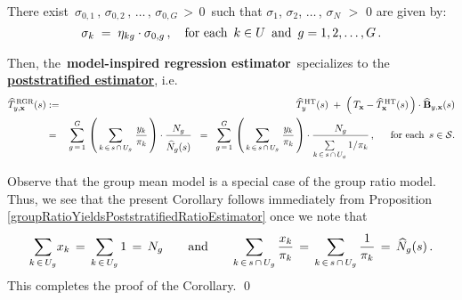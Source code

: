 \begin{corollary}
\begin{enumerate}
	There exist \,$\sigma_{0,1} \,,\, \sigma_{0,2} \,,\, \ldots \,,\, \sigma_{0,G} \,>\, 0$\,
	such that
	$\sigma_{1}$, $\sigma_{2}$, $\ldots$\,, $\sigma_{N}$ $>$ $0$ are given by:
	\begin{equation*}
	\sigma_{k} \; = \; \eta_{kg}\cdot\sigma_{0,g}\,,
	\quad\textnormal{for each \,$k \in U$\, and \,$g = 1,2,\ldots,G$}\,.
	\end{equation*}
\end{enumerate}
\renewcommand{\theenumi}{\roman{enumi}}
\renewcommand{\labelenumi}{\textnormal{(\theenumi)}$\;\;$}
Then, the \,\textbf{model-inspired regression estimator}\,
specializes to the \,\underline{\textbf{{\color{red}poststratified} estimator}}, i.e.
\begin{eqnarray*}
\widehat{T}^{\,\textnormal{RGR}}_{y,\mathbf{x}}(s)
& := &
	\widehat{T}^{\,\textnormal{HT}}_{y}(s)
	\; + \;
	\left(\,T_{\mathbf{x}} - \widehat{T}^{\,\textnormal{HT}}_{\mathbf{x}}(s) \,\right)
	\cdot
	\widehat{\mathbf{B}}_{y,\mathbf{x}}(s)
\\
& = &
	\overset{G}{\underset{g\,=\,1}{\sum}}\,
	\left(\, \underset{k\,\in\,s\,\cap\,U_{g}}{\sum}\; \dfrac{ y_{k} }{ \pi_{k}} \,\right)
	\cdot
	\dfrac{
		N_{g}
	}{
		\overset{{\color{white}.}}{\widehat{N}_{g}(s)}
	}
\;\; = \;\;
	\overset{G}{\underset{g\,=\,1}{\sum}}\,
	\left(\, \underset{k\,\in\,s\,\cap\,U_{g}}{\sum}\; \dfrac{ y_{k} }{ \pi_{k}} \,\right)
	\cdot
	\dfrac{
		N_{g}
	}{
		\underset{k\,\in\,s\,\cap\,U_{g}}{\overset{{\color{white}.}}{\sum}}\, 1/\pi_{k}
	}
	\,,\;\;\quad\textnormal{for each \,$s \in \mathcal{S}$}.
\end{eqnarray*}
\end{corollary}
\proof
Observe that {\color{red}the group mean model is a special case of the group ratio model}.
Thus, we see that the present Corollary follows immediately from
Proposition \ref{groupRatioYieldsPoststratifiedRatioEstimator}
once we note that
\begin{equation*}
	\underset{k\,\in\,U_{g}}{\sum} x_{k}
	\, = \, \underset{k\,\in\,U_{g}}{\sum}\, 1
	\, = \, N_{g}
\quad\quad\textnormal{and}\quad\quad
	\underset{k\,\in\,s\,\cap\,U_{g}}{\overset{{\color{white}.}}{\sum}}\, \dfrac{ x_{k} }{ \pi_{k} }
	\, = \, \underset{k\,\in\,s\,\cap\,U_{g}}{\overset{{\color{white}.}}{\sum}}\, \dfrac{ 1 }{ \pi_{k} }
	\, = \, \widehat{N}_{g}(s)\,.
\end{equation*}
This completes the proof of the Corollary.
\qed


\renewcommand{\theenumi}{\roman{enumi}}
\renewcommand{\labelenumi}{\textnormal{(\theenumi)}$\;\;$}

